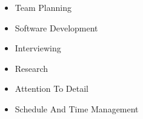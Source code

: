 
  \begin{itemize}
    \setlength\itemsep{-0.3em}
    \item Team Planning
    \item Software Development
    \item Interviewing %
    \item Research
    \item Attention To Detail
    \item Schedule And Time Management
  \end{itemize}
